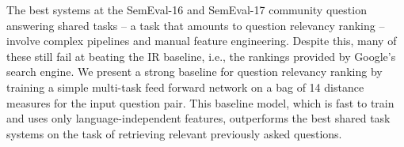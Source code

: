 The best systems at the SemEval-16 and SemEval-17 community question answering shared tasks -- a task that amounts to question relevancy ranking -- involve complex pipelines and manual feature engineering. Despite this, many of these still fail at beating the IR baseline, i.e., the rankings provided by Google's search engine. We present a strong baseline for question relevancy ranking by training a simple multi-task feed forward network on a bag of 14 distance measures for the input question pair. This baseline model, which is fast to train and uses only language-independent features, outperforms the best shared task systems on the task of retrieving relevant previously asked questions.
